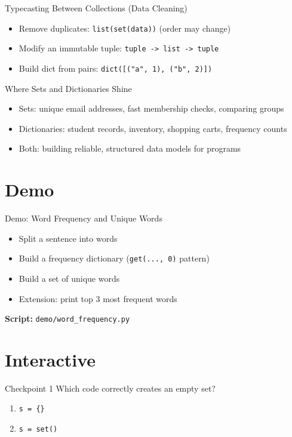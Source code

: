 \documentclass{beamer}
\begin{document}
\begin{frame}[fragile]{Typecasting Between Collections (Data Cleaning)}
  \begin{itemize}[<+->]
    \item Remove duplicates: \texttt{list(set(data))} (order may change)
    \item Modify an immutable tuple: \texttt{tuple -> list -> tuple}
    \item Build dict from pairs: \texttt{dict([("a", 1), ("b", 2)])}
  \end{itemize}
\end{frame}

\begin{frame}[fragile]{Where Sets and Dictionaries Shine}
  \begin{itemize}[<+->]
    \item Sets: unique email addresses, fast membership checks, comparing groups
    \item Dictionaries: student records, inventory, shopping carts, frequency counts
    \item Both: building reliable, structured data models for programs
  \end{itemize}
\end{frame}

\section{Demo}
\label{sec:demo}

\begin{frame}[fragile]{Demo: Word Frequency and Unique Words}
  \begin{itemize}[<+->]
    \item Split a sentence into words
    \item Build a frequency dictionary (\texttt{get(..., 0)} pattern)
    \item Build a set of unique words
    \item Extension: print top 3 most frequent words
  \end{itemize}
  \vspace{0.4em}
  \textbf{Script:} \texttt{demo/word\_frequency.py}
\end{frame}

\section{Interactive}
\label{sec:interactive}

\begin{frame}[fragile]{Checkpoint 1}
  Which code correctly creates an empty set?
  \begin{enumerate}[<+->]
    \item \texttt{s = \{\}}
    \item \texttt{s = set()}
  \end{enumerate}
\end{frame}
\end{document}
